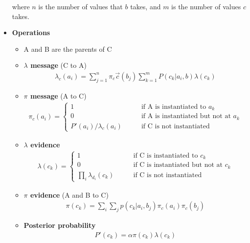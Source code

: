 \documentclass[12pt,twoside]{article}
\begin{document}
\begin{itemize}
        where \(n\) is the number of values that \(b\) takes, and \(m\) is the number of values \(c\) takes. 
    \item \textbf{Operations}
        \begin{itemize}
            \item A and B are the parents of C
            \item \textbf{\(\lambda\) message} (C to A)
                \begin{align} 
                    \lambda_c(a_i) = \sum_{j=1}^n\pi_{c}\vec{c}(b_j)\sum_{k=1}^m P(c_k|a_i,b)\lambda(c_k)
                \end{align}
            \item \textbf{\(\pi\) message} (A to C)
                \begin{align}
					  \pi_c(a_i)=\begin{cases}
                                   1\qquad &\text{if A is instantiated to }a_k\\
                                   0 \qquad &\text{if A is instantiated but not at }a_k \\
                                   P'(a_i)/\lambda_c(a_i) \qquad &\text{if C is not instantiated}
								\end{cases}
                \end{align}
            \item \textbf{\(\lambda\) evidence}
                \begin{align}
					  \lambda(c_k)=\begin{cases}
                                   1\qquad &\text{if C is instantiated to }c_k\\
                                   0 \qquad &\text{if C is instantiated but not at }c_k \\
                                   \prod_i \lambda_{d_i}(c_k) \qquad &\text{if C is not instantiated}
								\end{cases}
                \end{align}
            \item \textbf{\(\pi\) evidence} (A and B to C)
                \begin{align}
                    \pi(c_k) = \sum_i\sum_jp(c_k|a_i,b_j)\pi_c(a_i)\pi_c(b_j)
                \end{align}
            \item \textbf{Posterior probability}
                \begin{align}
                    P'(c_k)=\alpha \pi(c_k)\lambda(c_k)
                \end{align}
        \end{itemize}
\end{itemize}
\end{document}
